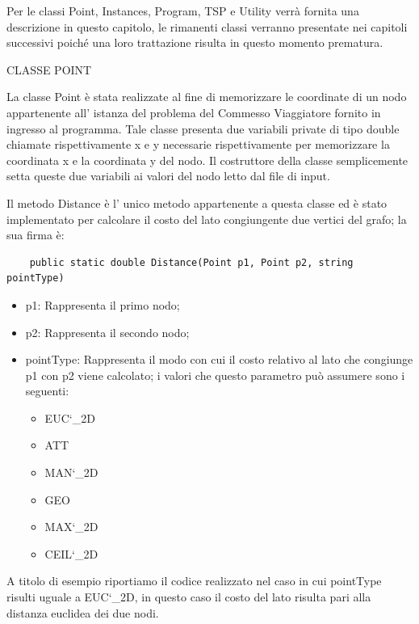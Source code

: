 \documentclass[11pt]{article}
\begin{document}
Per le classi Point, Instances, Program, TSP e Utility verr\`a fornita una descrizione in questo capitolo, le rimanenti classi verranno presentate nei capitoli successivi poich\'e una loro trattazione risulta in questo momento prematura. 


\vspace{2\baselineskip}
CLASSE POINT
\vspace{2\baselineskip}

La classe Point \`e stata realizzate al fine di memorizzare le coordinate di un nodo appartenente all' istanza del problema del Commesso Viaggiatore fornito in ingresso al programma. Tale classe presenta due variabili private di tipo double chiamate rispettivamente x e y necessarie rispettivamente per memorizzare la coordinata x e la coordinata y del nodo. Il costruttore della classe semplicemente setta queste due variabili ai valori del nodo letto dal file di input. 

Il metodo Distance \`e l' unico metodo appartenente a questa classe ed \`e stato implementato per  calcolare il costo del lato congiungente due vertici del grafo; la sua firma \`e:

\begin{lstlisting}
    public static double Distance(Point p1, Point p2, string pointType)
\end{lstlisting}

\begin{itemize}
\item p1: Rappresenta il primo nodo;
\item p2: Rappresenta il secondo nodo;
\item pointType: Rappresenta il modo con cui il costo relativo al lato che congiunge p1 con p2 viene calcolato; i valori che questo parametro pu\`o assumere sono i seguenti:
	\begin{itemize}
	\item EUC\char`_2D
	\item ATT
	\item MAN\char`_2D
	\item GEO
	\item MAX\char`_2D	
	\item CEIL\char`_2D
	\end{itemize}
\end{itemize}

A titolo di esempio riportiamo il codice realizzato nel caso in cui pointType risulti uguale a EUC\char`_2D, in questo caso il costo del lato risulta pari alla distanza euclidea dei due nodi. 
\end{document}
